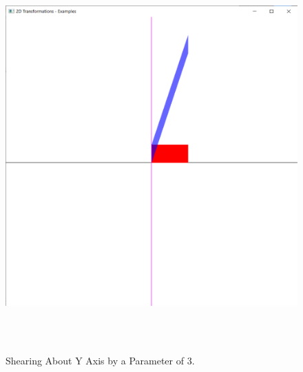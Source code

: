 \documentclass[12pt, a4]{article}
\begin{document}
\subsection*{}
\begin{figure}[h]
\centering
\caption{Shearing About Y Axis by a Parameter of 3.}
\includegraphics[height=15cm, width=15cm]{Outputs/Output-13.png}
\end{figure}

\newpage
\end{document}
